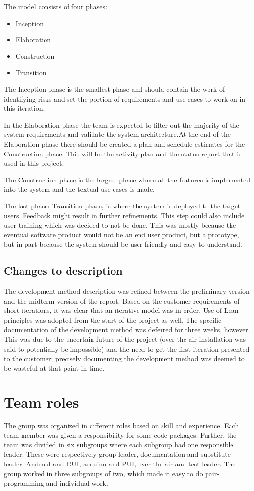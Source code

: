 The model consists of four phases:

\begin{itemize}
\item{Inception}
\item{Elaboration}
\item{Construction}
\item{Transition}
\end{itemize}

The Inception phase is the smallest phase and should contain the work of identifying risks and set the portion of requirements and use cases to work on in this iteration.

In the Elaboration phase the team is expected to filter out the majority of the system requirements and validate the system architecture.At the end of the Elaboration phase there should be created a plan and schedule estimates for the Construction phase. This will be the activity plan and the status report that is used in this project.

The Construction phase is the largest phase where all the features is implemented into the system and the textual use cases is made.

The last phase: Transition phase, is where the system is deployed to the target users. Feedback might result in further refinements. This step could also include user training which was decided to not be done. This was mostly because the eventual software product would not be an end user product, but a prototype, but in part because the system should be user friendly and easy to understand.

\subsection{Changes to description}
The development method description was refined between the preliminary version and the midterm version of the report. Based on the customer requirements of short iterations, it was clear that an iterative model was in order. Use of Lean principles was adopted from the start of the project as well.
The specific documentation of the development method was deferred for three weeks, however. This was due to the uncertain future of the project (over the air installation was said to potentially be impossible) and the need to get the first iteration presented to the customer; precisely documenting the development method was deemed to be wasteful at that point in time.


\section{Team roles}
The group was organized in different roles based on skill and experience. Each team member was given a responsibility for some code-packages. Further, the team was divided in six subgroups where each subgroup had one responsible leader. These were respectively group leader, documentation and substitute leader, Android and GUI, arduino and PUI, over the air and test leader. The group worked in three subgroups of two, which made it easy to do pair-programming and individual work.

